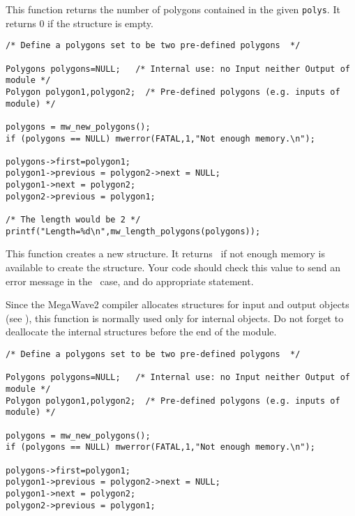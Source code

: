 \newpage %


\Description
This function returns the number of polygons contained in the given
\verb+polys+. It returns $0$ if the structure is empty.

\Next
\Example
\begin{verbatim}
/* Define a polygons set to be two pre-defined polygons  */

Polygons polygons=NULL;   /* Internal use: no Input neither Output of module */
Polygon polygon1,polygon2;  /* Pre-defined polygons (e.g. inputs of module) */

polygons = mw_new_polygons();
if (polygons == NULL) mwerror(FATAL,1,"Not enough memory.\n");

polygons->first=polygon1;
polygon1->previous = polygon2->next = NULL;
polygon1->next = polygon2;
polygon2->previous = polygon1;

/* The length would be 2 */
printf("Length=%d\n",mw_length_polygons(polygons));

\end{verbatim}
\newpage %

\Description
This function creates a new \polygons structure.
It returns \Null\ if not enough memory is available to create the structure.
Your code should check this value to send an
error message in the \Null\ case, and do appropriate statement.

Since the MegaWave2 compiler allocates structures for input and output 
objects (see \volI), this function is normally used only for internal objects.
Do not forget to deallocate the internal structures before the end
of the module.

\Next
\Example
\begin{verbatim}
/* Define a polygons set to be two pre-defined polygons  */

Polygons polygons=NULL;   /* Internal use: no Input neither Output of module */
Polygon polygon1,polygon2;  /* Pre-defined polygons (e.g. inputs of module) */

polygons = mw_new_polygons();
if (polygons == NULL) mwerror(FATAL,1,"Not enough memory.\n");

polygons->first=polygon1;
polygon1->previous = polygon2->next = NULL;
polygon1->next = polygon2;
polygon2->previous = polygon1;
\end{verbatim}
\newpage %

